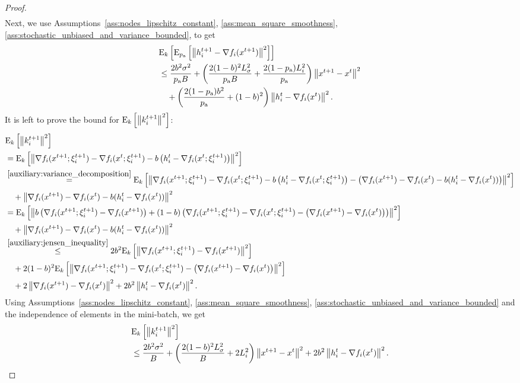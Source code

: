 \documentclass{article}
\newcommand*{\probavailable}{\ensuremath{p_{\textnormal{a}}}}
\begin{document}
\begin{proof}
\begin{align*}
  \end{align*}
  Next, we use Assumptions~\ref{ass:nodes_lipschitz_constant}, \ref{ass:mean_square_smoothness}, \ref{ass:stochastic_unbiased_and_variance_bounded}, to get
  \begin{align*}
    &\ExpSub{k}{\ExpSub{\probavailable}{\norm{h^{t+1}_i - \nabla f_i(x^{t+1})}^2}} \\
    &\leq \frac{2 b^2 \sigma^2}{\probavailable B}  + \left(\frac{2 (1 - b)^2 L_{\sigma}^2}{\probavailable B} + \frac{2(1 - \probavailable) L_i^2}{\probavailable}\right)\norm{x^{t+1} - x^{t}}^2 \\
    &\quad + \left(\frac{2 (1 - \probavailable) b^2}{\probavailable} + (1 - b)^2\right)\norm{h^t_i - \nabla f_i(x^{t})}^2.\\
  \end{align*}
  It is left to prove the bound for ${\rm E}_{k}\left[\left\| k^{t+1}_i \right\|^2\right]$:
  \begin{align*}
    &{\rm E}_{k}\left[\left\| k^{t+1}_i \right\|^2\right] \\
    &= {\rm E}_{k}\left[\left\| \nabla f_i(x^{t+1};\xi^{t+1}_{i}) - \nabla f_i(x^{t};\xi^{t+1}_{i}) - b \left(h^t_i - \nabla f_i(x^{t};\xi^{t+1}_{i})\right) \right\|^2\right] \\
    &\overset{\eqref{auxiliary:variance_decomposition}}{=} {\rm E}_{k}\left[\left\| \nabla f_i(x^{t+1};\xi^{t+1}_{i}) - \nabla f_i(x^{t};\xi^{t+1}_{i}) - b \left(h^t_i - \nabla f_i(x^{t};\xi^{t+1}_{i})\right) - \left(\nabla f_i(x^{t+1}) - \nabla f_i(x^{t}) - b(h^t_i - \nabla f_i(x^{t}))\right) \right\|^2\right] \\
    &\quad + \left\| \nabla f_i(x^{t+1}) - \nabla f_i(x^{t}) - b(h^t_i - \nabla f_i(x^{t})) \right\|^2 \\
    &= {\rm E}_{k}\left[\left\| b \left(\nabla f_i(x^{t+1};\xi^{t+1}_{i}) - \nabla f_i(x^{t+1})\right) + (1 - b) \left(\nabla f_i(x^{t+1};\xi^{t+1}_{i}) - \nabla f_i(x^{t};\xi^{t+1}_{i}) - \left(\nabla f_i(x^{t+1}) - \nabla f_i(x^{t})\right)\right) \right\|^2\right] \\
    &\quad + \left\| \nabla f_i(x^{t+1}) - \nabla f_i(x^{t}) - b(h^t_i - \nabla f_i(x^{t})) \right\|^2 \\
    &\overset{\eqref{auxiliary:jensen_inequality}}{\leq} 2 b^2 {\rm E}_{k}\left[\left\| \nabla f_i(x^{t+1};\xi^{t+1}_{i}) - \nabla f_i(x^{t+1}) \right\|^2\right] \\
    &\quad + 2 (1 - b)^2 {\rm E}_{k}\left[\left\| \nabla f_i(x^{t+1};\xi^{t+1}_{i}) - \nabla f_i(x^{t};\xi^{t+1}_{i}) - \left(\nabla f_i(x^{t+1}) - \nabla f_i(x^{t})\right) \right\|^2\right] \\
    &\quad + 2 \left\| \nabla f_i(x^{t+1}) - \nabla f_i(x^{t}) \right\|^2 + 2 b^2 \left\| h^t_i - \nabla f_i(x^{t}) \right\|^2.
  \end{align*}
  Using Assumptions~\ref{ass:nodes_lipschitz_constant}, \ref{ass:mean_square_smoothness}, \ref{ass:stochastic_unbiased_and_variance_bounded} and the independence of elements in the mini-batch, we get
  \begin{align*}
    &{\rm E}_{k}\left[\left\| k^{t+1}_i \right\|^2\right] \\
    &\leq \frac{2 b^2 \sigma^2}{B} + \left(\frac{2 (1 - b)^2 L_{\sigma}^2}{B} + 2 L_i^2\right)\left\| x^{t+1} - x^{t} \right\|^2 + 2 b^2 \left\| h^t_i - \nabla f_i(x^{t}) \right\|^2.
  \end{align*}
\end{proof}
\end{document}

